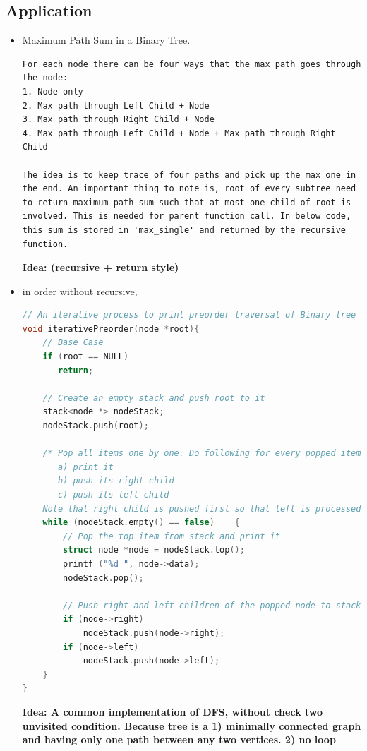 \documentclass[a4paper,12pt,twoside]{book}
\begin{document}
\subsection{Application}
\begin{itemize}
\item Maximum Path Sum in a Binary Tree. 
\begin{lstlisting}[breaklines]
For each node there can be four ways that the max path goes through the node:
1. Node only
2. Max path through Left Child + Node
3. Max path through Right Child + Node
4. Max path through Left Child + Node + Max path through Right Child

The idea is to keep trace of four paths and pick up the max one in the end. An important thing to note is, root of every subtree need to return maximum path sum such that at most one child of root is involved. This is needed for parent function call. In below code, this sum is stored in 'max_single' and returned by the recursive function.
\end{lstlisting}

\textbf{Idea: (recursive + return style)}

\item in order without recursive, 
\begin{lstlisting}[frame=single, language=c++]
// An iterative process to print preorder traversal of Binary tree
void iterativePreorder(node *root){
    // Base Case
    if (root == NULL)
       return;
 
    // Create an empty stack and push root to it
    stack<node *> nodeStack;
    nodeStack.push(root);
 
    /* Pop all items one by one. Do following for every popped item
       a) print it
       b) push its right child
       c) push its left child
    Note that right child is pushed first so that left is processed first */
    while (nodeStack.empty() == false)    {
        // Pop the top item from stack and print it
        struct node *node = nodeStack.top();
        printf ("%d ", node->data);
        nodeStack.pop();
 
        // Push right and left children of the popped node to stack
        if (node->right)
            nodeStack.push(node->right);
        if (node->left)
            nodeStack.push(node->left);
    }
}
\end{lstlisting}

\textbf{Idea: A common implementation of DFS, without check two unvisited condition. Because tree is a 1) minimally connected graph and having only one path between any two vertices. 2) no loop}


\end{itemize}
\end{document}
